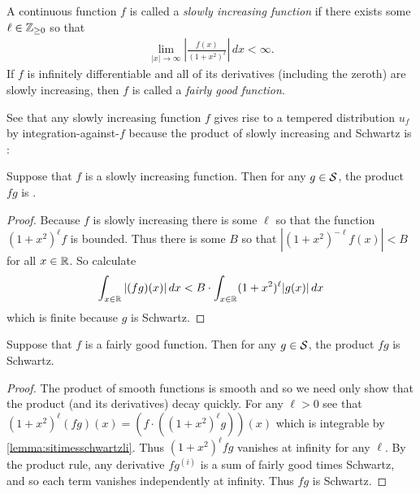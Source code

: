   \begin{defn}
    A continuous function $f$ is called a \emph{slowly increasing function} if there exists some $\ell\in\Z_{\ge0}$ so that
    \begin{align*}
      \lim_{|x|\rightarrow\infty} \left| \frac{f(x)}{(1+x^2)^{\ell}} \right| \,dx < \infty \text{.}
    \end{align*}
    If $f$ is infinitely differentiable and all of its derivatives (including the zeroth) are slowly increasing, then $f$ is called a \emph{fairly good function}.
  \end{defn}
  See that any slowly increasing function $f$ gives rise to a tempered distribution $u_f$ by integration-against-$f$ because the product of slowly increasing and Schwartz is \li:
  \begin{lemma}
    \label{lemma:sitimesschwartzli}
    Suppose that $f$ is a slowly increasing function.
    Then for any $g\in\S$, the product $fg$ is \li.
  \end{lemma}
  \begin{proof}
    Because $f$ is slowly increasing there is some $\ell$ so that the function $(1+x^2)^\ell f$ is bounded.
    Thus there is some $B$ so that $|(1+x^2)^{-\ell} f(x)|<B$ for all $x\in\R$.
    So calculate
    \begin{align*}
      \int_{x\in\R} |(fg)(x)|\,dx
      < B\cdot \int_{x\in\R} (1+x^2)^\ell |g(x)|\,dx
    \end{align*}
    which is finite because $g$ is Schwartz.
  \end{proof}
  \begin{lemma}
    Suppose that $f$ is a fairly good function.
    Then for any $g\in\S$, the product $fg$ is Schwartz.
  \end{lemma}
  \begin{proof}
    The product of smooth functions is smooth and so we need only show that the product (and its derivatives) decay quickly.
    For any $\ell>0$ see that $(1+x^2)^\ell (fg)(x) = \left(f\cdot((1+x^2)^\ell g)\right)(x)$ which is integrable by \cref{lemma:sitimesschwartzli}.
    Thus $(1+x^2)^\ell fg$ vanishes at infinity for any $\ell$.
    By the product rule, any derivative $fg^{(i)}$ is a sum of fairly good times Schwartz, and so each term vanishes independently at infinity.
    Thus $fg$ is Schwartz.
  \end{proof}

